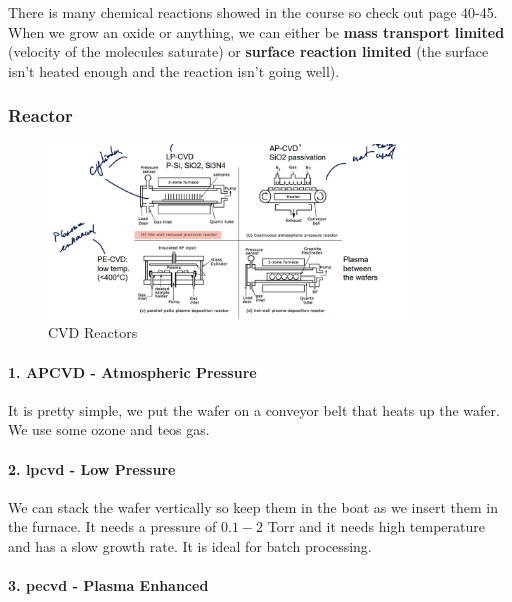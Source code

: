\documentclass[
]{article}
\begin{document}
There is many chemical reactions showed in the course so check out page
40-45. When we grow an oxide or anything, we can either be \textbf{mass
transport limited} (velocity of the molecules saturate) or
\textbf{surface reaction limited} (the surface isn't heated enough and
the reaction isn't going well).

\hypertarget{reactor}{%
\subsubsection{Reactor}\label{reactor}}

\begin{figure}
\hypertarget{fig:cvd-reactors-label}{%
\centering
\includegraphics[width=0.85\textwidth,height=\textheight]{reactor.png}
\caption{CVD Reactors}\label{fig:cvd-reactors-label}
}
\end{figure}

\hypertarget{apcvd---atmospheric-pressure}{%
\paragraph{1. APCVD - Atmospheric
Pressure}\label{apcvd---atmospheric-pressure}}

It is pretty simple, we put the wafer on a conveyor belt that heats up
the wafer. We use some ozone and {teos} gas.

\hypertarget{lpcvd---low-pressure}{%
\paragraph{\texorpdfstring{2. {lpcvd} - Low
Pressure}{2. lpcvd - Low Pressure}}\label{lpcvd---low-pressure}}

We can stack the wafer vertically so keep them in the boat as we insert
them in the furnace. It needs a pressure of \(0.1-2\) Torr and it needs
high temperature and has a slow growth rate. It is ideal for batch
processing.

\hypertarget{pecvd---plasma-enhanced}{%
\paragraph{\texorpdfstring{3. {pecvd} - Plasma
Enhanced}{3. pecvd - Plasma Enhanced}}\label{pecvd---plasma-enhanced}}
\end{document}
